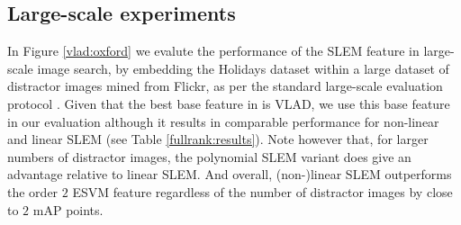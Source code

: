 \subsection{Large-scale experiments}

In Figure \ref{vlad:oxford} we evalute the performance of the SLEM feature in large-scale image search, by embedding the Holidays dataset within a large dataset of distractor images mined from Flickr, as per the standard large-scale evaluation protocol \cite{holidays,Delhumeau2013,ZePe15}. Given that the best base feature in \cite{ZePe15} is VLAD, we use this base feature in our evaluation although it results in comparable performance for non-linear and linear SLEM (see Table \ref{fullrank:results}). Note however that, for larger numbers of distractor images, the polynomial SLEM variant does give an advantage relative to linear SLEM. And overall, (non-)linear SLEM outperforms the order $2$ ESVM feature regardless of the number of distractor images by close to $2$ mAP points.




